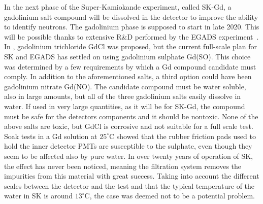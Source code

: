 In the next phase of the Super-Kamiokande experiment, called SK-Gd, a gadolinium salt compound %
will be dissolved in the detector to improve the ability to identify neutrons.
The gadolinium phase is supposed to start in late 2020.
This will be possible thanks to extensive R\&D performed by the EGADS experiment~\cite{Ikeda:2019pcm}.
In , gadolinium trichloride GdCl was proposed, %
but the current full-scale plan for SK and EGADS has settled on using gadolinium sulphate Gd(SO).
This choice was determined by a few requirements by which a Gd compound candidate must comply.
In addition to the aforementioned salts, a third option could have been gadolinium nitrate Gd(NO).
The candidate compound must be water soluble, also in large amounts, but all of the three gadolinium salts %
easily dissolve in water.
If used in very large quantities, as it will be for SK-Gd, the compound must be safe for %
the detectors components and it should be nontoxic. %
None of the above salts are toxic, but GdCl is corrosive and not suitable for a full scale test.
Soak tests in a Gd solution at $25^\circ$C showed that the rubber friction pads used to hold the inner detector PMTs %
are susceptible to the sulphate, even though they seem to be affected also by pure water.
In over twenty years of operation of SK, the effect has never been noticed, meaning the filtration system %
removes the impurities from this material with great success.
Taking into account the different scales between the detector and the test and that the typical temperature %
of the water in SK is around $13^\circ$C, the case was deemed not to be a potential problem.
